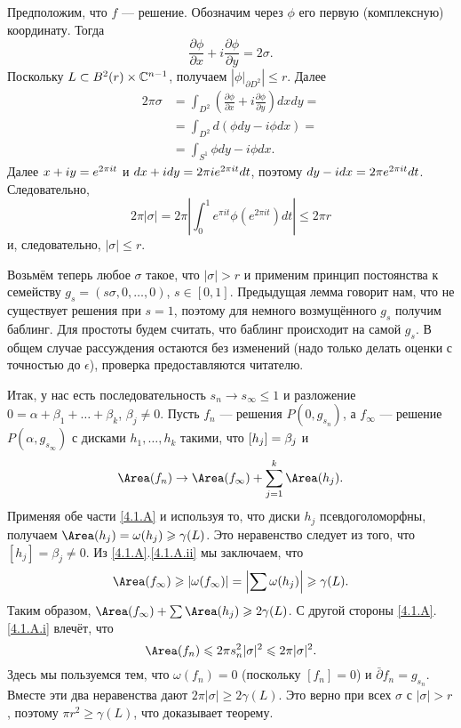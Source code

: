 Предположим, что $f$ --- решение.
Обозначим через $\phi$ его первую (комплексную) координату.
Тогда 
\[\frac{\partial\phi}{\partial x}+i\frac{\partial\phi}{\partial y} = 2\sigma.\]
Поскольку $L \subset B^2 (r) \times \mathbb{C}^{n-1}$, получаем $\left|\phi|_{\partial D^2}\right|\le r$.
Далее 
\begin{align*}
2\pi\sigma &= \int_{D^2}\left(\frac{\partial\phi}{\partial x}+i\frac{\partial\phi}{\partial y}\right)dxdy =
\\
&=\int_{D^2} d (\phi dy - i\phi dx)  = 
\\
&=\int_{S^1}\phi dy - i\phi dx.
\end{align*}
Далее $x + iy \z= e^{2\pi i t}$ и $dx + idy \z= 2\pi i e^{2\pi it} dt$, поэтому $dy - idx \z= 2\pi e^{2\pi i t} dt$.
Следовательно,
\[2\pi | \sigma | 
= 
2\pi\left|\int_0^1  e^{\pi i t} \phi(e^{2\pi i t})dt\right|
\le
2\pi r \]
и, следовательно, $| \sigma | \le r$.
\qeds


Возьмём теперь любое $\sigma$ такое, что $| \sigma | > r$ и применим принцип постоянства к семейству $g_s = (s\sigma, 0 ,\dots, 0)$, $s \in [0, 1]$.
Предыдущая лемма говорит нам, что не существует решения при $s = 1$, поэтому для немного возмущённого $g_s$ получим баблинг.
Для простоты будем считать, что баблинг происходит на самой $g_s$.
В общем случае рассуждения остаются без изменений (надо только делать оценки с точностью до $\epsilon$), проверка предоставляются читателю.

Итак, у нас есть последовательность $s_n \to s_\infty \le 1$ и разложение $0 = \alpha + \beta_1 +\dots+ \beta_k$, $\beta_j \ne 0$.
Пусть $f_n$ --- решения $P (0, g_{s_n})$, а $f_\infty$ --- решение $P
(\alpha, g_{s_\infty})$ с  дисками $h_1,\dots,h_k$ такими, что $[h_j] \z= \beta_j$ и
\[\Area (f_n)
\to 
\Area (f_\infty) + \sum_{j=1}^k\Area (h_j).\]
Применяя обе части \ref{4.1.A} и используя то, что диски $h_j$
псевдоголоморфны, получаем
$\Area (h_j) = \omega (h_j) \ge \gamma (L)$.
Это неравенство следует из того, что $[h_j] = \beta_j \ne 0$.
Из \ref{4.1.A}.\ref{4.1.A.ii} мы заключаем, что 
\[\Area (f_\infty)
\ge
|\omega(f_\infty)|
=
\left|\sum\omega (h_j)\right|
\ge
\gamma(L).\]
Таким образом, $\Area (f_\infty) + \sum \Area (h_j) \ge 2\gamma (L)$.
С другой стороны \ref{4.1.A}.\ref{4.1.A.i} влечёт, что 
\[\Area(f_n)
\le
2\pi s^2_n|\sigma|^2
\le
2\pi|\sigma|^2.
\]
Здесь мы пользуемся тем, что $\omega (f_n) = 0$ (поскольку $[f_n] = 0$) и $\bar\partial f_n=g_{s_n}$.
Вместе эти два неравенства дают $2\pi | \sigma | \ge 2\gamma (L)$.
Это верно при всех $\sigma$ с $| \sigma | > r$, поэтому $\pi r^2 \ge \gamma (L)$, что доказывает теорему.
\qeds

